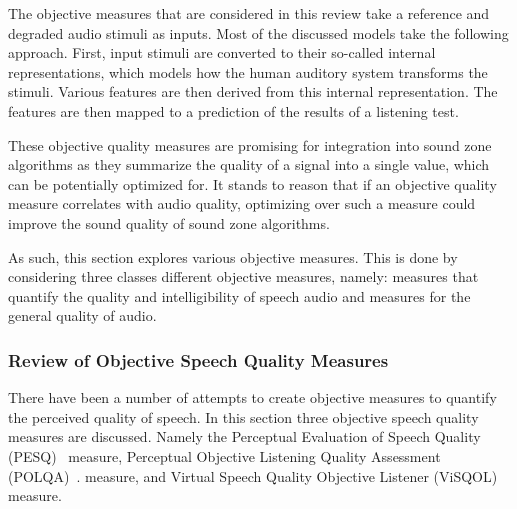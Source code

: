 The objective measures that are considered in this review take a reference and degraded audio stimuli as inputs.
Most of the discussed models take the following approach.
First, input stimuli are converted to their so-called internal representations, which models how the 
human auditory system transforms the stimuli.
Various features are then derived from this internal representation.
The features are then mapped to a prediction of the results of a listening test.

These objective quality measures are promising for integration into sound zone algorithms as they summarize the 
quality of a signal into a single value, which can be potentially optimized for. 
It stands to reason that if an objective quality measure correlates with audio quality, optimizing over such a measure
could improve the sound quality of sound zone algorithms.

As such, this section explores various objective measures.
This is done by considering three classes different objective measures, namely: measures that quantify the quality 
and intelligibility of speech audio and measures for the general quality of audio. 

\subsubsection{Review of Objective Speech Quality Measures}
There have been a number of attempts to create objective measures to quantify the perceived quality of speech.
In this section three objective speech quality measures are discussed.
Namely the Perceptual Evaluation of Speech Quality (PESQ)~\cite{rix2001perceptual} measure,
Perceptual Objective Listening Quality Assessment (POLQA)~\cite{beerends2013perceptual}. measure, and 
Virtual Speech Quality Objective Listener (ViSQOL)~\cite{hines2012visqol,chinen2020visqol} measure.

